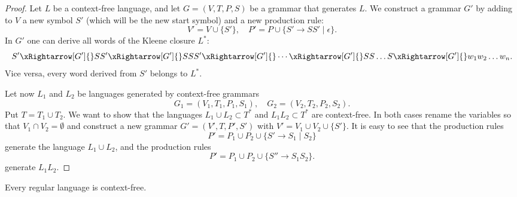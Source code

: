 \begin{page}
\setcounter{section}{7}
\setcounter{subsection}{1}
\setcounter{dfn}{1}
\label{portion:1150}


\begin{proof}
Let $L$ be a context-free language, and let $G = (V, T, P, S)$ be a grammar that generates $L$.
We construct a grammar $G'$ by adding to $V$ a new symbol $S'$ (which will be the new start symbol) and a new production rule:
\[
V' = V \cup \{S'\}, \quad P' = P \cup \{S' \to SS' \mid \epsilon\}.
\]
In $G'$ one can derive all words of the Kleene closure $L^*$:
\[
S' \xRightarrow[G']{} SS' \xRightarrow[G']{} SSS' \xRightarrow[G']{} \cdots \xRightarrow[G']{} SS \ldots S \xRightarrow[G']{} w_1 w_2 \ldots w_n.
\]
Vice versa, every word derived from $S'$ belongs to $L^*$.

Let now $L_1$ and $L_2$ be languages generated by context-free grammars
\[
G_1 = (V_1, T_1, P_1, S_1), \quad G_2 = (V_2, T_2, P_2, S_2).
\]
Put $T = T_1 \cup T_2$.
We want to show that the languages $L_1 \cup L_2 \subset T^*$ and $L_1L_2 \subset T^*$ are context-free.
In both cases rename the variables so that $V_1 \cap V_2 = \emptyset$
and construct a new grammar $G' = (V', T, P', S')$ with $V' = V_1 \cup V_2 \cup \{S'\}$.
It is easy to see that the production rules
\[
P' = P_1 \cup P_2 \cup \{S' \to S_1 \mid S_2\}
\]
generate the language $L_1 \cup L_2$,
and the production rules
\[
P' = P_1 \cup P_2 \cup \{S'' \to S_1S_2\}.
\]
generate $L_1L_2$.
\end{proof}


\end{page}

\begin{page}
\setcounter{section}{7}
\setcounter{subsection}{1}
\setcounter{dfn}{2}
\label{portion:1152}

\begin{cor}
Every regular language is context-free.
\end{cor}

\end{page}

